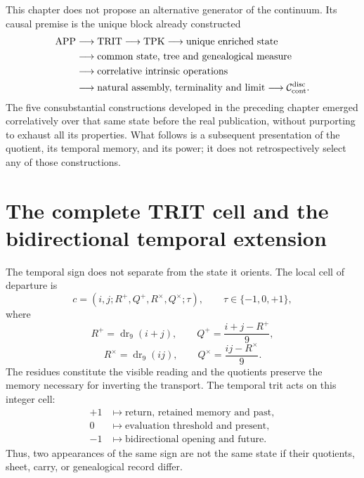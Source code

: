 \label{chap:83-19}

This chapter does not propose an alternative generator of the continuum. Its
causal premise is the unique block already constructed
\[
 \begin{aligned}
 \mathrm{APP}&\longrightarrow\mathrm{TRIT}\longrightarrow\mathrm{TPK}
 \longrightarrow\text{unique enriched state}\\
 &\longrightarrow\text{common state, tree and genealogical measure}\\
 &\longrightarrow\text{correlative intrinsic operations}\\
 &\longrightarrow\text{natural assembly, terminality and limit}
 \longrightarrow\mathcal C_{\rm cont}^{\rm disc}.
 \end{aligned}
\]
The five consubstantial constructions developed in the preceding chapter emerged correlatively over that same state before the real publication, without purporting to exhaust all its properties. What follows is a subsequent presentation of the quotient, its temporal memory, and its power; it does not retrospectively select any of those constructions.

\section{The complete TRIT cell and the bidirectional temporal extension}

The temporal sign does not separate from the state it orients. The local cell of
departure is
\begin{equation}
 c=(i,j;R^+,Q^+,R^\times,Q^\times;\tau),
 \qquad \tau\in\{-1,0,+1\},
 \label{p12-83-c19-s1:hmtch:eq-celula-trit-completa}
\end{equation}
where
\[
 R^+=\operatorname{dr}_9(i+j),\qquad
 Q^+=\frac{i+j-R^+}{9},
\]
\[
 R^\times=\operatorname{dr}_9(ij),\qquad
 Q^\times=\frac{ij-R^\times}{9}.
\]
The residues constitute the visible reading and the quotients preserve the
memory necessary for inverting the transport. The temporal trit acts on
this integer cell:
\begin{equation}
\begin{aligned}
 +1&\longmapsto \text{return, retained memory and past},\\
 0&\longmapsto \text{evaluation threshold and present},\\
 -1&\longmapsto \text{bidirectional opening and future}.
\end{aligned}
\label{p12-83-c19-s1:hmtch:eq-lector-temporal-trit}
\end{equation}
Thus, two appearances of the same sign are not the same state if their
quotients, sheet, carry, or genealogical record differ.

